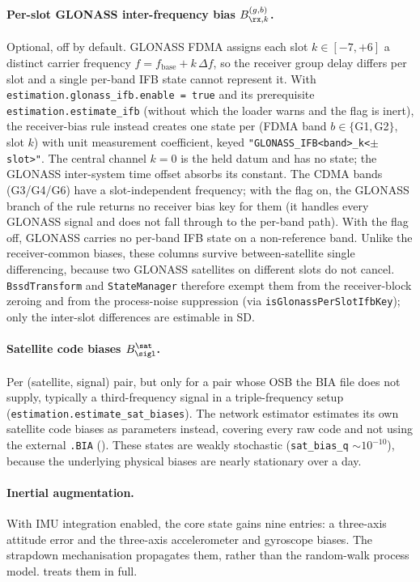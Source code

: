 \paragraph{Per-slot GLONASS inter-frequency bias $B^{(g,b)}_{\rx,k}$.}
Optional, off by default.  GLONASS FDMA assigns each slot $k\in[-7,+6]$
a distinct carrier frequency $f = f_{\mathrm{base}} + k\,\Delta f$, so
the receiver group delay differs per slot and a single per-band IFB state
cannot represent it.  With \texttt{estimation.glonass\_ifb.enable = true}
and its prerequisite \texttt{estimation.estimate\_ifb} (without which the
loader warns and the flag is inert), the receiver-bias rule instead
creates one state per (FDMA band $b\in\{$G1,\,G2$\}$, slot $k$) with
unit measurement coefficient, keyed
\texttt{"GLONASS\_IFB<band>\_k<$\pm$slot>"}.  The central channel $k=0$
is the held datum and has no state; the GLONASS inter-system time offset
absorbs its constant.  The CDMA bands (G3/G4/G6) have a slot-independent
frequency; with the flag on, the GLONASS branch of the rule
returns no receiver bias key for them (it
handles every GLONASS signal and does not fall through to the per-band
path).  With the flag off, GLONASS carries no per-band IFB state on a
non-reference band.  Unlike the receiver-common biases, these columns
survive between-satellite single differencing, because two GLONASS
satellites on different slots do not cancel.  \texttt{BssdTransform} and
\texttt{StateManager} therefore exempt them from the receiver-block
zeroing and from the process-noise suppression (via
\texttt{isGlonassPerSlotIfbKey}); only the inter-slot differences are
estimable in SD.

\paragraph{Satellite code biases $B^\sat_\sigl$.}
Per (satellite, signal) pair, but only for a pair whose OSB the BIA file
does not supply, typically a third-frequency signal in a triple-frequency
setup (\texttt{estimation.estimate\_sat\_biases}).  The network estimator
estimates its own satellite code biases as parameters instead, covering every
raw code and not using the external \texttt{.BIA} ().
These states are weakly stochastic (\texttt{sat\_bias\_q} $\sim 10^{-10}$),
because the underlying physical biases are nearly stationary over a day.

\paragraph{Inertial augmentation.}
With IMU integration enabled, the core state gains nine entries: a
three-axis attitude error and the three-axis accelerometer and gyroscope
biases.  The strapdown mechanisation propagates them, rather than the
random-walk process model.  
treats them in full.

